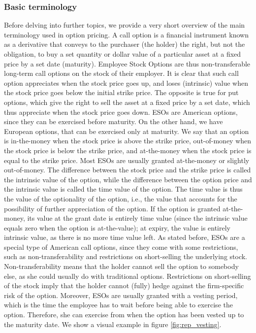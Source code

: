 \subsubsection{Basic terminology}
    Before delving into further topics, we provide a very short overview of the main terminology used in option pricing.
    A call option is a financial instrument known as a derivative that conveys to the purchaser (the holder) the right, but not the obligation, to buy a set quantity or dollar value of a particular asset at a fixed price by a set date (maturity). Employee Stock Options are thus non-transferable long-term call options on the stock of their employer. It is clear that such call option appreciates when the stock price goes up, and loses (intrinsic) value when the stock price goes below the initial strike price. The opposite is true for put options, which give the right to sell the asset at a fixed price by a set date, which thus appreciate when the stock price goes down.
    ESOs are American options, since they can be exercised before maturity. On the other hand, we have European options, that can be exercised only at maturity. We say that an option is in-the-money when the stock price is above the strike price, out-of-money when the stock price is below the strike price, and at-the-money when the stock price is equal to the strike price. Most ESOs are usually granted at-the-money or slightly out-of-money. 
    The difference between the stock price and the strike price is called the intrinsic value of the option, while the difference between the option price and the intrinsic value is called the time value of the option. The time value is thus the value of the optionality of the option, i.e., the value that accounts for the possibility of further appreciation of the option. If the option is granted at-the-money, its value at the grant date is entirely time value (since the intrinsic value equals zero when the option is at-the-value); at expiry, the value is entirely intrinsic value, as there is no more time value left.
    As stated before, ESOs are a special type of American call options, since they come with some restrictions, such as non-transferability and restrictions on short-selling the underlying stock. Non-transferability means that the holder cannot sell the option to somebody else, as she could usually do with traditional options. Restrictions on short-selling of the stock imply that the holder cannot (fully) hedge against the firm-specific risk of the option. Moreover, ESOs are usually granted with a vesting period, which is the time the employee has to wait before being able to exercise the option. Therefore, she can exercise from when the option has been vested up to the maturity date. We show a visual example in figure \ref{fig:rep_vesting}. 

